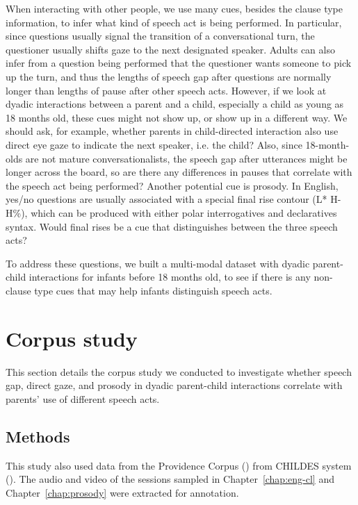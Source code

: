 When interacting with other people, we use many cues, besides the clause type information, to infer what kind of speech act is being performed. In particular, since questions usually signal the transition of a conversational turn, the questioner usually shifts gaze to the next designated speaker. Adults can also infer from a question being performed that the questioner wants someone to pick up the turn, and thus the lengths of speech gap after questions are normally longer than lengths of pause after other speech acts. However, if we look at dyadic interactions between a parent and a child, especially a child as young as 18 months old, these cues might not show up, or show up in a different way. We should ask, for example, whether parents in child-directed interaction also use direct eye gaze to indicate the next speaker, i.e. the child? Also, since 18-month-olds are not mature conversationalists, the speech gap after utterances might be longer across the board, so are there any differences in pauses that correlate with the speech act being performed? Another potential cue is prosody. In English, yes/no questions are usually associated with a special final rise contour (L* H-H\%), which can be produced with either polar interrogatives and declaratives syntax. Would final rises be a cue that distinguishes between the three speech acts?

To address these questions, we built a multi-modal dataset with dyadic parent-child interactions for infants before 18 months old, to see if there is any non-clause type cues that may help infants distinguish speech acts.

\section{Corpus study}
\label{sec:engsp:corpus}

This section details the corpus study we conducted to investigate whether speech gap, direct gaze, and prosody in dyadic parent-child interactions correlate with parents' use of different speech acts. 


\subsection{Methods}
\label{sec:engsp:corpus:method}
This study also used data from the Providence Corpus (\citealt{ProvidenceCorpus}) from CHILDES system (\citealt{CHILDES}). The audio and video of the sessions sampled in Chapter~\ref{chap:eng-cl} and Chapter~\ref{chap:prosody} were extracted for annotation. 


